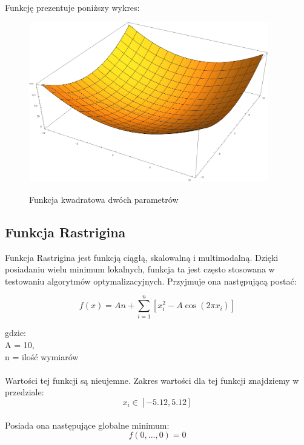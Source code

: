 \documentclass[twoside]{projektInzynierskiMS1}
\newcommand{\newLine}{~\\}
\newcommand{\si}{ś}
\begin{document}
Funkcję prezentuje poniższy wykres:\\
\begin{figure}[H]
	\begin{center}
		\includegraphics[height=7cm]{quadraticFunction1.png}\\
	\end{center}
	\caption{Funkcja kwadratowa dwóch parametrów}
\end{figure}

	\subsection{Funkcja Rastrigina}
	Funkcja Rastrigina jest funkcją ciągłą, skalowalną i multimodalną. Dzięki posiadaniu wielu minimum lokalnych, funkcja ta jest często stosowana w testowaniu algorytmów optymalizacyjnych. Przyjmuje ona następującą postać:

\[f(x) = An + \sum_{i=1}^{n} [x_i^2 - A \cos{(2 \pi x_i)}] \]

gdzie: \\
A = 10, \\
n = ilo\si ć wymiarów \\ \newLine

Warto\si ci tej funkcji są nieujemne. Zakres warto\si ci dla tej funkcji znajdziemy w przedziale:
\[x_i \in [-5.12, 5.12] \] \\

Posiada ona następujące globalne minimum:
\[ f(0,...,0) = 0 \] \\
\end{document}
